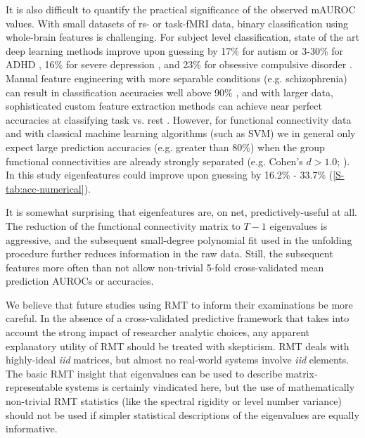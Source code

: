 \documentclass[12pt]{spieman}  %
\begin{document}
\begin{spacing}{2}
It is also difficult to quantify the practical significance of the observed
mAUROC values. With small datasets of rs- or task-fMRI data, binary
classification using whole-brain features is challenging. For subject level
classification, state of the art deep learning methods improve upon guessing by
17\% for autism \cite{bengs4DSpatioTemporalDeep2020} or 3-30\% for ADHD
\cite{riazDeepFMRIEndtoendDeep2020}, 16\% for severe depression
\cite{ramasubbuAccuracyAutomatedClassification2016}, and 23\% for obsessive
compulsive disorder \cite{takagiNeuralMarkerObsessiveCompulsive2017}. Manual
feature engineering with more separable conditions (e.g. schizophrenia) can
result in classification accuracies well above 90\%
\cite{duHighClassificationAccuracy2012}, and with larger data, sophisticated
custom feature extraction methods can achieve near perfect accuracies at
classifying task vs. rest
\cite{zhangCharacterizingDifferentiatingTaskbased2016}. However, for functional
connectivity data and with classical machine learning algorithms (such as SVM)
we in general only expect large prediction accuracies (e.g. greater than 80\%)
when the group functional connectivities are already strongly separated (e.g.
Cohen’s \(d > 1.0\); ). In
this study eigenfeatures could improve upon guessing by 16.2\% - 33.7\%
(\ref{S-tab:acc-numerical}).

It is somewhat surprising that eigenfeatures are, on net, predictively-useful
at all. The reduction of the functional connectivity matrix to \(T - 1\)
eigenvalues is aggressive, and the subsequent small-degree polynomial fit used
in the unfolding procedure further reduces information in the raw data.
Still, the subsequent features more often than not allow non-trivial 5-fold
cross-validated mean prediction AUROCs or accuracies.

We believe that future studies using RMT to inform their examinations be more
careful. In the absence of a cross-validated predictive framework that takes
into account the strong impact of researcher analytic choices, any apparent
explanatory utility of RMT should be treated with skepticism. RMT deals with
highly-ideal \textit{iid} matrices, but almost no real-world systems involve
\textit{iid} elements. The basic RMT insight that eigenvalues can be used to
describe matrix-representable systems is certainly vindicated here, but the use
of mathematically non-trivial RMT statistics (like the spectral rigidity or
level number variance) should not be used if simpler statistical descriptions
of the eigenvalues are equally informative.


\end{spacing}
\end{document}

